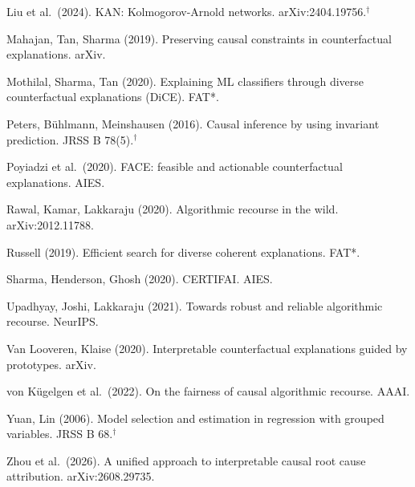 \documentclass[aspectratio=169]{beamer}
\begin{document}
\begin{frame}
{    Liu et al.\ (2024). KAN: Kolmogorov-Arnold networks. arXiv:2404.19756.$^\dagger$\par
    Mahajan, Tan, Sharma (2019). Preserving causal constraints in counterfactual explanations. arXiv.\par
    Mothilal, Sharma, Tan (2020). Explaining ML classifiers through diverse counterfactual explanations (DiCE). FAT*.\par
    Peters, B\"uhlmann, Meinshausen (2016). Causal inference by using invariant prediction. JRSS B 78(5).$^\dagger$\par
    Poyiadzi et al.\ (2020). FACE: feasible and actionable counterfactual explanations. AIES.\par
    Rawal, Kamar, Lakkaraju (2020). Algorithmic recourse in the wild. arXiv:2012.11788.\par
    Russell (2019). Efficient search for diverse coherent explanations. FAT*.\par
    Sharma, Henderson, Ghosh (2020). CERTIFAI. AIES.\par
    Upadhyay, Joshi, Lakkaraju (2021). Towards robust and reliable algorithmic recourse. NeurIPS.\par
    Van Looveren, Klaise (2020). Interpretable counterfactual explanations guided by prototypes. arXiv.\par
    von K\"ugelgen et al.\ (2022). On the fairness of causal algorithmic recourse. AAAI.\par
    Yuan, Lin (2006). Model selection and estimation in regression with grouped variables. JRSS B 68.$^\dagger$\par
    Zhou et al.\ (2026). A unified approach to interpretable causal root cause attribution. arXiv:2608.29735.\par
    \par}
\end{frame}
\end{document}
